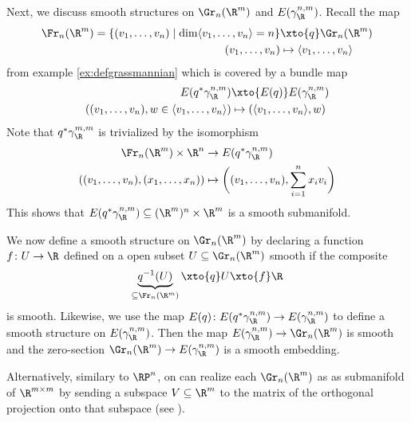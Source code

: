 Next, we discuss smooth structures on $\Gr_n(\R^m)$ and $E(\gamma_\R^{n, m})$.
Recall the map 
\begin{align*}
	\Fr_n(\R^m) = \{(v_1, \ldots, v_n) \mid \dim \langle v_1, \ldots, v_n \rangle = n\} &\xto{q} \Gr_n(\R^m) \\
	(v_1, \ldots, v_n) &\mapsto \langle v_1, \ldots, v_n \rangle
\end{align*}
from example \ref{ex:defgrassmannian} which is covered by a bundle map
\begin{align*}
	E(q^* \gamma_\R^{n, m}) &\xto{E(q)} E(\gamma_\R^{n, m}) \\
	((v_1, \ldots, v_n), w \in \langle v_1, \ldots, v_n \rangle) &\mapsto (\langle v_1, \ldots, v_n \rangle, w)
\end{align*}
Note that $q^* \gamma_\R^{m, m}$ is trivialized by the isomorphism
\begin{align*}
	\Fr_n(\R^m) \times \R^n &\to E(q^* \gamma_\R^{n, m}) \\
	((v_1, \ldots, v_n), (x_1, \ldots, x_n)) &\mapsto \bigg((v_1, \ldots, v_n), \sum_{i = 1}^n x_i v_i \bigg)
\end{align*}
This shows that $E(q^* \gamma_\R^{n, m}) \subseteq (\R^m)^n \times \R^m$ is a smooth submanifold.

We now define a smooth structure on $\Gr_n(\R^m)$ by declaring a function $f\colon U \to \R$ defined on a open subset $U \subseteq \Gr_n(\R^m)$ smooth if the composite
\begin{equation*}
	\underbrace{q^{-1}(U)}_{\subseteq \Fr_n(\R^m)} \xto{q} U \xto{f} \R
\end{equation*}
is smooth.
Likewise, we use the map $E(q)\colon E(q^* \gamma_\R^{n, m}) \to E(\gamma_\R^{n, m})$ to define a smooth structure on $E(\gamma_\R^{n, m})$.
Then the map $E(\gamma_\R^{n, m}) \to \Gr_n(\R^m)$ is smooth and the zero-section $\Gr_n(\R^m) \to E(\gamma_\R^{n, m})$ is a smooth embedding.

Alternatively, similary to $\RP^n$, on can realize each $\Gr_n(\R^m)$ as as submanifold of $\R^{m \times m}$ by sending a subspace $V \subseteq \R^m$ to the matrix of the orthogonal projection onto that subspace (see \cite[Problems 5-A -- 5-C]{milnor_characteristic_1974}).

